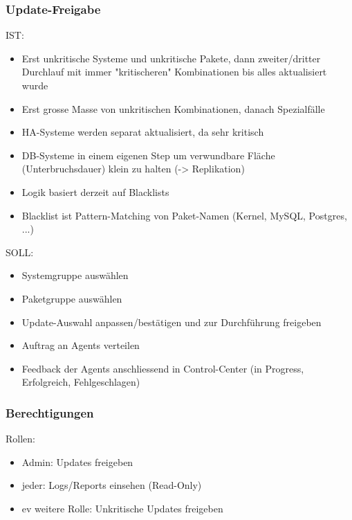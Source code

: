 \documentclass[class=scrbook,crop=false]{standalone}
\begin{document}
    \subsubsection{Update-Freigabe}
    
    IST:
    
    \begin{itemize}
        \item Erst unkritische Systeme und unkritische Pakete, dann zweiter/dritter Durchlauf mit immer "kritischeren" Kombinationen bis alles aktualisiert wurde
        \item Erst grosse Masse von unkritischen Kombinationen, danach Spezialfälle
        \item HA-Systeme werden separat aktualisiert, da sehr kritisch
        \item DB-Systeme in einem eigenen Step um verwundbare Fläche (Unterbruchsdauer) klein zu halten (-> Replikation)
        \item Logik basiert derzeit auf Blacklists
        \item Blacklist ist Pattern-Matching von Paket-Namen (Kernel, MySQL, Postgres, ...)
    \end{itemize}
    
    SOLL:
    
    \begin{itemize}
        \item Systemgruppe auswählen
        \item Paketgruppe auswählen
        \item Update-Auswahl anpassen/bestätigen und zur Durchführung freigeben
        \item Auftrag an Agents verteilen
        \item Feedback der Agents anschliessend in Control-Center (in Progress, Erfolgreich, Fehlgeschlagen)
    \end{itemize}
    
    \subsubsection{Berechtigungen}
    
    Rollen:
    
    \begin{itemize}
        \item Admin: Updates freigeben
        \item jeder: Logs/Reports einsehen (Read-Only)
        \item ev weitere Rolle: Unkritische Updates freigeben
    \end{itemize}
    
\end{document}
